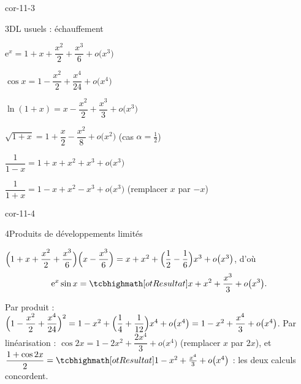 \begin{blocLivre}{cor-11-3}
\begin{corrige}{3}{DL usuels : échauffement}
\begin{questions}
  \item $\mathrm{e}^{x}=1+x+\dfrac{x^{2}}{2}+\dfrac{x^{3}}{6}+o\bigl(x^{3}\bigr)$
  \item $\cos x=1-\dfrac{x^{2}}{2}+\dfrac{x^{4}}{24}+o\bigl(x^{4}\bigr)$
  \item $\ln(1+x)=x-\dfrac{x^{2}}{2}+\dfrac{x^{3}}{3}+o\bigl(x^{3}\bigr)$
  \item $\sqrt{1+x}=1+\dfrac{x}{2}-\dfrac{x^{2}}{8}+o\bigl(x^{2}\bigr)$
    (cas $\alpha=\tfrac12$)
  \item $\dfrac{1}{1-x}=1+x+x^{2}+x^{3}+o\bigl(x^{3}\bigr)$
  \item $\dfrac{1}{1+x}=1-x+x^{2}-x^{3}+o\bigl(x^{3}\bigr)$
    (remplacer $x$ par $-x$)
\end{questions}
\end{corrige}
\end{blocLivre}

\begin{blocLivre}{cor-11-4}
\begin{corrige}{4}{Produits de développements limités}
\begin{questions}
  \item $\Bigl(1+x+\dfrac{x^{2}}{2}+\dfrac{x^{3}}{6}\Bigr)
    \Bigl(x-\dfrac{x^{3}}{6}\Bigr)
    =x+x^{2}+\Bigl(\dfrac12-\dfrac16\Bigr)x^{3}+o\bigl(x^{3}\bigr)$, d'où
    \[
    \mathrm{e}^{x}\sin x=\res{x+x^{2}+\frac{x^{3}}{3}+o\bigl(x^{3}\bigr)}.
    \]
  \item Par produit :
    $\Bigl(1-\dfrac{x^{2}}{2}+\dfrac{x^{4}}{24}\Bigr)^{2}
    =1-x^{2}+\Bigl(\dfrac14+\dfrac{1}{12}\Bigr)x^{4}+o\bigl(x^{4}\bigr)
    =1-x^{2}+\dfrac{x^{4}}{3}+o\bigl(x^{4}\bigr)$.
    Par linéarisation : $\cos2x=1-2x^{2}+\dfrac{2x^{4}}{3}+o\bigl(x^{4}\bigr)$
    (remplacer $x$ par $2x$), et
    $\dfrac{1+\cos2x}{2}=\res{1-x^{2}+\frac{x^{4}}{3}+o\bigl(x^{4}\bigr)}$ :
    les deux calculs concordent.
\end{questions}
\end{corrige}
\end{blocLivre}

